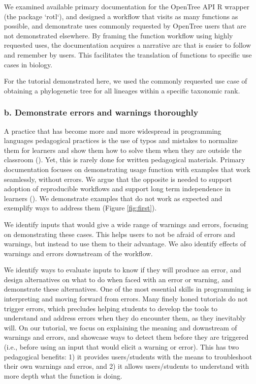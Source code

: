 \documentclass[12pt]{article}
\begin{document}
We examined available primary documentation for the OpenTree API R wrapper (the package `rotl`),
and designed a workflow that visits as many functions as possible, and demonstrate
uses commonly requested by OpenTree users that are not demonstrated elsewhere.
By framing the function workflow using highly requested uses, the documentation acquires a
narrative arc that is easier to follow and remember by users. This facilitates the translation
of functions to specific use cases in biology.

For the tutorial demonstrated here, we used the commonly requested use case of obtaining
a phylogenetic tree for all lineages within a specific taxonomic rank.

\subsubsection*{b. Demonstrate errors and warnings thoroughly}

A practice that has become more and more widespread in programming languages pedagogical practices
is the use of typos and mistakes to normalize them for learners and show them how
to solve them when they are outside the classroom (\cite{shannon2015live}).
Yet, this is rarely done for written pedagogical materials.
Primary documentation focuses on demonstrating usage function with examples that
work seamlessly, without errors. We argue that the opposite is needed to support
adoption of reproducible workflows and support long term independence in learners
(\cite{gaspar2007restoring}).
We demonstrate examples that do not work
as expected and exemplify ways to address them (Figure \ref{fig:first}).

We identify inputs that would give
a wide range of warnings and errors, focusing on demonstrating these cases. This
helps users to not be afraid of errors and warnings, but instead to use them to
their advantage.
We also identify effects of warnings and errors downstream of the workflow.

We identify ways to evaluate inputs to know if they will produce an error, and design
alternatives on what to do when faced with an error or warning, and demonstrate
these alternatives.
One of the most essential skills in programming is interpreting and moving forward
from errors.
Many finely honed tutorials do not trigger errors, which precludes helping students
to develop the tools to understand and address errors when they do encounter them,
as they inevitably will.
On our tutorial, we focus on explaining the meaning and downstream of warnings and errors, and
 showcase ways to detect them before they are triggered (i.e., before using an input
  that would elicit a warning or error). This has two pedagogical benefits:
1) it provides users/students with the means to troubleshoot their own warnings and erros, and
2) it allows users/students to understand with more depth what the function is doing.
\end{document}

